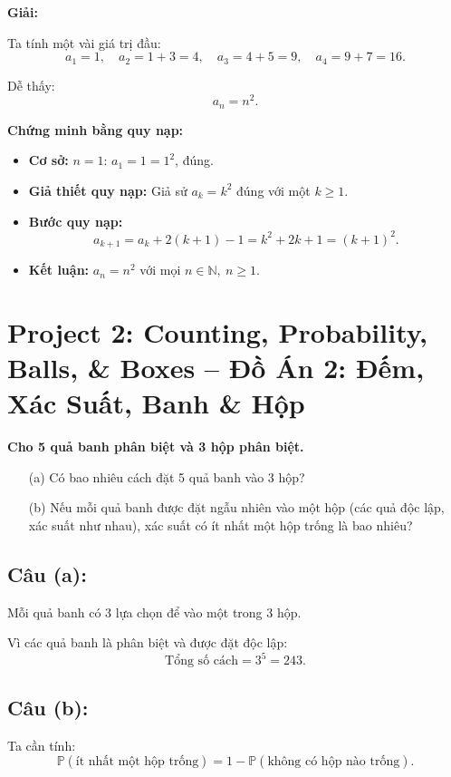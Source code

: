\documentclass{article}
\begin{document}
	\textbf{Giải:}
	
	Ta tính một vài giá trị đầu:
	\[
	a_1 = 1,\quad a_2 = 1 + 3 = 4,\quad a_3 = 4 + 5 = 9,\quad a_4 = 9 + 7 = 16.
	\]
	
	Dễ thấy:
	\[
	a_n = n^2.
	\]
	
	\textbf{Chứng minh bằng quy nạp:}
	
	\begin{itemize}[leftmargin=1.5cm]
		\item \textbf{Cơ sở:} $n = 1$: $a_1 = 1 = 1^2$, đúng.
		
		\item \textbf{Giả thiết quy nạp:} Giả sử $a_k = k^2$ đúng với một $k \ge 1$.
		
		\item \textbf{Bước quy nạp:}
		\[
		a_{k+1} = a_k + 2(k+1) - 1 = k^2 + 2k + 1 = (k+1)^2.
		\]
		
		\item \textbf{Kết luận:} $a_n = n^2$ với mọi $n \in \mathbb{N},\ n \ge 1$.
	\end{itemize}
	
	\section*{Project 2: Counting, Probability, Balls, \& Boxes -- Đồ Án 2: Đếm, Xác Suất, Banh \& Hộp}
	
	\textbf{Cho 5 quả banh phân biệt và 3 hộp phân biệt.}
	
	\begin{itemize}[leftmargin=1.5cm]
		\item[(a)] Có bao nhiêu cách đặt 5 quả banh vào 3 hộp?
		\item[(b)] Nếu mỗi quả banh được đặt ngẫu nhiên vào một hộp (các quả độc lập, xác suất như nhau), xác suất có ít nhất một hộp trống là bao nhiêu?
	\end{itemize}
	
	\subsection*{Câu (a):}
	Mỗi quả banh có 3 lựa chọn để vào một trong 3 hộp.
	
	Vì các quả banh là phân biệt và được đặt độc lập:
	\[
	\text{Tổng số cách} = 3^5 = 243.
	\]
	
	\subsection*{Câu (b):}
	Ta cần tính:
	\[
	\mathbb{P}(\text{ít nhất một hộp trống}) = 1 - \mathbb{P}(\text{không có hộp nào trống}).
	\]
	
\end{document}
